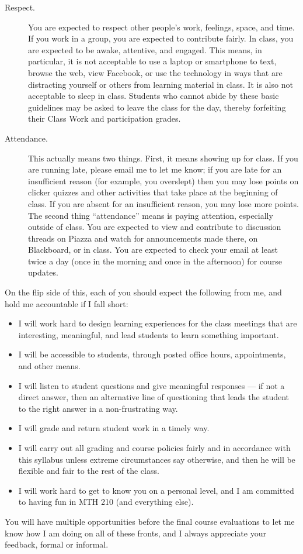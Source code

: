 \documentclass[11pt]{article}
\begin{document}
\begin{description}
	\item[Respect.] You are expected to respect other people's work, feelings, space, and time. If you work in a group, you are expected to contribute fairly. In class, you are expected to be awake, attentive, and engaged. This means, in particular, it is not acceptable to use a laptop or smartphone to text, browse the web, view Facebook, or use the technology in ways that are distracting yourself or others from learning material in class. It is also not acceptable to sleep in class. Students who cannot abide by these basic guidelines may be asked to leave the class for the day, thereby forfeiting their Class Work and participation grades. 
	\item[Attendance.] This actually means two things. First, it means showing up for class. If you are running late, please email me to let me know; if you are late for an insufficient reason (for example, you overslept) then you may lose points on clicker quizzes and other activities that take place at the beginning of class. If you are absent for an insufficient reason, you may lose more points. The second thing ``attendance'' means is paying attention, especially outside of class. You are expected to view and contribute to discussion threads on Piazza and watch for announcements made there, on Blackboard, or in class. You are expected to check your email at least twice a day (once in the morning and once in the afternoon) for course updates. 	
\end{description}

On the flip side of this, each of you should expect the following from me, and hold me accountable if I fall short: 
\begin{itemize}
	\item I will work hard to design learning experiences for the class meetings that are interesting, meaningful, and lead students to learn something important. 
	\item I will be accessible to students, through posted office hours, appointments, and other means. 
	\item I will listen to student questions and give meaningful responses --- if not a direct answer, then an alternative line of questioning that leads the student to the right answer in a non-frustrating  way. 
	\item I will grade and return student work in a timely way. 
	\item I will carry out all grading and course policies fairly and in accordance with this syllabus unless extreme circumstances say otherwise, and then he will be flexible and fair to the rest of the class. 
	\item I will work hard to get to know you on a personal level, and I am committed to having fun in MTH 210 (and everything else). 
\end{itemize}
You will have multiple opportunities before the final course evaluations to let me know how I am doing on all of these fronts, and I always appreciate your feedback, formal or informal. 
\end{document}
